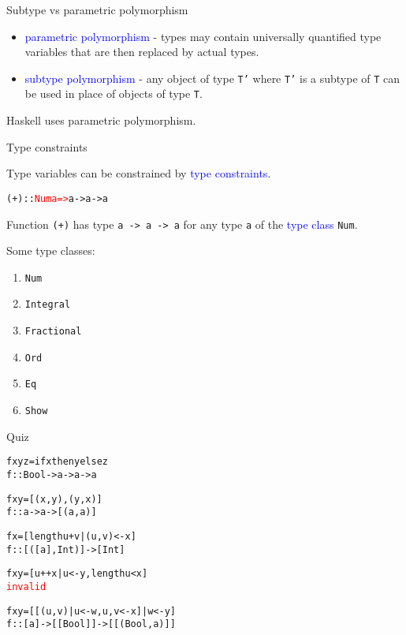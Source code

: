 \documentclass{beamer}
\def\code#1{\texttt{\frenchspacing#1}}
\begin{document}
\begin{frame}{Subtype vs parametric polymorphism}

\begin{itemize}
    \item \textcolor{blue}{parametric polymorphism} - types may contain universally quantified type variables that are then replaced by actual types.
    \item \textcolor{blue}{subtype polymorphism} - any object of type \code{T'} where \code{T'} is a subtype of \code{T} can be used in place of objects of type \code{T}.
\end{itemize}

\pause

\vspace{1cm}
Haskell uses parametric polymorphism.

\end{frame}

\begin{frame}[fragile]{Type constraints}

Type variables can be constrained by \textcolor{blue}{type constraints}.

\begin{alltt}
(+) :: \textcolor{red}{Num a =>} a -> a -> a
\end{alltt}

Function \code{(+)} has type \code{a -> a -> a} for any type \code{a} of the \textcolor{blue}{type class} \code{Num}.

\pause

\vspace{1cm}
Some type classes:
\begin{enumerate}
    \item \code{Num}
    \item \code{Integral}
    \item \code{Fractional}
    \item \code{Ord}
    \item \code{Eq}
    \item \code{Show}
\end{enumerate}

\end{frame}

\begin{frame}[fragile]{Quiz}

\begin{alltt}
f x y z = if x then y else z\pause
f :: Bool -> a -> a -> a

f x y = [(x,y), (y,x)]\pause
f :: a -> a -> [(a,a)]

f x = [ length u + v | (u,v) <- x ]\pause
f :: [([a],Int)] -> [Int]

f x y = [ u ++ x | u <- y, length u < x ]\pause
\textcolor{red}{invalid}

f x y = [[ (u,v) | u <- w, u, v <- x] | w <- y]\pause
f :: [a] -> [[Bool]] -> [[(Bool, a)]]
\end{alltt}

\end{frame}
\end{document}
